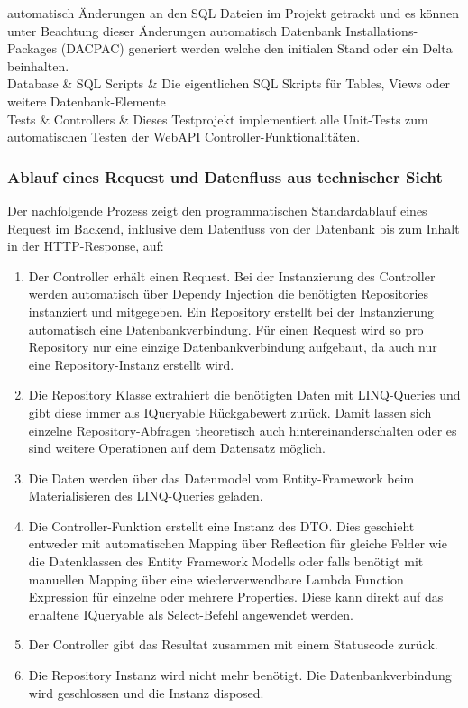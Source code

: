 \documentclass[a4paper,10pt,xetex]{article}
\begin{document}
\begin{longtabu}
			automatisch \"Anderungen an den SQL Dateien im Projekt getrackt und es k\"onnen unter Beachtung dieser \"Anderungen
			automatisch Datenbank Installations-Packages (DACPAC) generiert werden welche den initialen Stand oder ein Delta
			beinhalten.\\\hline
		Database &
		SQL Scripts &
		Die eigentlichen SQL Skripts f\"ur Tables, Views oder weitere Datenbank-Elemente\\\hline
		Tests &
		Controllers &
		Dieses Testprojekt implementiert alle Unit-Tests zum automatischen Testen der WebAPI
			Controller-Funktionalit\"aten. \\\hline
\end{longtabu}

\bigskip

\subsubsection[Ablauf eines Request und Datenfluss aus technischer Sicht]{Ablauf eines Request und Datenfluss aus technischer Sicht}

	Der nachfolgende Prozess zeigt den programmatischen Standardablauf eines Request im Backend, inklusive dem Datenfluss
	von der Datenbank bis zum Inhalt in der HTTP-Response, auf:


\begin{enumerate}
	\item
		Der Controller erh\"alt einen Request. Bei der Instanzierung des Controller werden automatisch \"uber Dependy Injection
		die ben\"otigten Repositories instanziert und mitgegeben. Ein Repository erstellt bei der Instanzierung automatisch
		eine Datenbankverbindung. F\"ur einen Request wird so pro Repository nur eine einzige Datenbankverbindung aufgebaut, da
		auch nur eine Repository-Instanz erstellt wird.
	\item
		Die Repository Klasse extrahiert die ben\"otigten Daten mit LINQ-Queries und gibt diese immer als IQueryable
		R\"uckgabewert zur\"uck. Damit lassen sich einzelne Repository-Abfragen theoretisch auch hintereinanderschalten oder es
		sind weitere Operationen auf dem Datensatz m\"oglich.
	\item 
		Die Daten werden \"uber das Datenmodel vom Entity-Framework beim Materialisieren des LINQ-Queries geladen. 
	\item 
		Die Controller-Funktion erstellt eine Instanz des DTO. Dies geschieht entweder mit automatischen Mapping \"uber
		Reflection f\"ur gleiche Felder wie die Datenklassen des Entity Framework Modells oder falls ben\"otigt mit manuellen
		Mapping \"uber eine wiederverwendbare Lambda Function Expression f\"ur einzelne oder mehrere Properties. Diese kann
		direkt auf das erhaltene IQueryable als Select-Befehl angewendet werden.
	\item 
		Der Controller gibt das Resultat zusammen mit einem Statuscode zur\"uck.
	\item 
		Die Repository Instanz wird nicht mehr ben\"otigt. Die Datenbankverbindung wird geschlossen und die Instanz disposed.
\end{enumerate}
\end{document}
